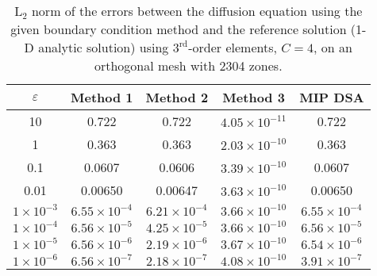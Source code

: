 \documentclass{article}
\begin{document}
\begin{table}[!h]
\centering
{\renewcommand{\arraystretch}{1.5}
\begin{tabular}{|c|c|c|c|c|}
\hline
$\varepsilon$ & Method 1 & Method 2 & Method 3 & MIP DSA \\\hline
10 & 0.722 & 0.722 & $4.05 \times 10^{-11}$ & 0.722 \\\hline
1 & 0.363 & 0.363 & $2.03 \times 10^{-10}$ & 0.363 \\\hline
0.1 & 0.0607 & 0.0606 & $3.39 \times 10^{-10}$ & 0.0607 \\\hline
0.01 & 0.00650 & 0.00647 & $3.63 \times 10^{-10}$ & 0.00650 \\\hline
$1 \times 10^{-3}$ & $6.55 \times 10^{-4}$ & $6.21 \times 10^{-4}$ & $3.66 \times 10^{-10}$ & $6.55 \times 10^{-4}$ \\\hline
$1 \times 10^{-4}$ & $6.56 \times 10^{-5}$ & $4.25 \times 10^{-5}$ & $3.66 \times 10^{-10}$ & $6.56 \times 10^{-5}$ \\\hline
$1 \times 10^{-5}$ & $6.56 \times 10^{-6}$ & $2.19 \times 10^{-6}$ & $3.67 \times 10^{-10}$ & $6.54 \times 10^{-6}$ \\\hline
$1 \times 10^{-6}$ & $6.56 \times 10^{-7}$ & $2.18 \times 10^{-7}$ & $4.08 \times 10^{-10}$ & $3.91 \times 10^{-7}$ \\\hline
\end{tabular}}
\caption{L$_2$ norm of the errors between the diffusion equation using the given boundary condition method and the reference solution (1-D analytic solution) using $3^\text{rd}$-order elements, $C=4$, on an orthogonal mesh with 2304 zones.}
\label{tab:1DDiffusionComparison}
\end{table}

\FloatBarrier
\end{document}
